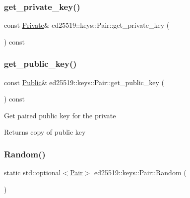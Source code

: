 \subsubsection{\texorpdfstring{get\+\_\+private\+\_\+key()}{get\_private\_key()}}
{\footnotesize\ttfamily const \mbox{\hyperlink{classed25519_1_1keys_1_1_private}{Private}}\& ed25519\+::keys\+::\+Pair\+::get\+\_\+private\+\_\+key (\begin{DoxyParamCaption}{ }\end{DoxyParamCaption}) const\hspace{0.3cm}{\ttfamily [inline]}}

\mbox{\label{classed25519_1_1keys_1_1_pair_aad6c01fdb3b75ce2b05e51dbc833ac72}} 
\subsubsection{\texorpdfstring{get\+\_\+public\+\_\+key()}{get\_public\_key()}}
{\footnotesize\ttfamily const \mbox{\hyperlink{classed25519_1_1keys_1_1_public}{Public}}\& ed25519\+::keys\+::\+Pair\+::get\+\_\+public\+\_\+key (\begin{DoxyParamCaption}{ }\end{DoxyParamCaption}) const\hspace{0.3cm}{\ttfamily [inline]}}

Get paired public key for the private \begin{DoxyReturn}{Returns}
copy of public key 
\end{DoxyReturn}
\mbox{\label{classed25519_1_1keys_1_1_pair_a56deb8f1bf6d1a51313abebd5a41d6fc}} 
\subsubsection{\texorpdfstring{Random()}{Random()}}
{\footnotesize\ttfamily static std\+::optional$<$\mbox{\hyperlink{classed25519_1_1keys_1_1_pair}{Pair}}$>$ ed25519\+::keys\+::\+Pair\+::\+Random (\begin{DoxyParamCaption}{ }\end{DoxyParamCaption})\hspace{0.3cm}{\ttfamily [static]}}

